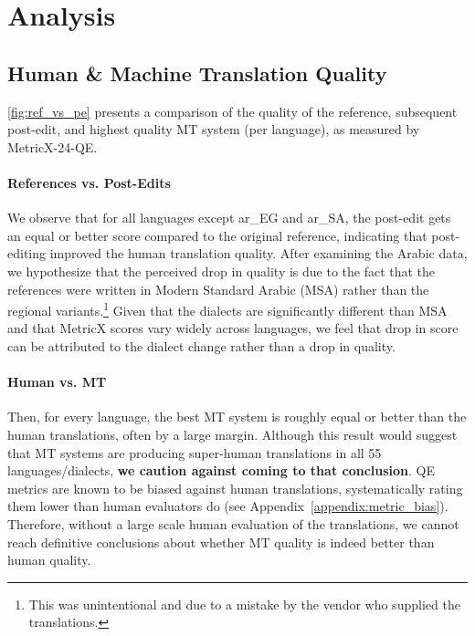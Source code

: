 \section{Analysis}



\subsection{Human \& Machine Translation Quality}
\label{sec:human_vs_mt_quality}

\autoref{fig:ref_vs_pe} presents a comparison of the quality of the reference, subsequent post-edit, and highest quality MT system (per language), as measured by MetricX-24-QE.


\paragraph{References vs. Post-Edits}
We observe that for all languages except ar\_EG and ar\_SA, the post-edit gets an equal or better score compared to the original reference, indicating that post-editing improved the human translation quality.
After examining the Arabic data, we hypothesize that the perceived drop in quality is due to the fact that the  references were written in Modern Standard Arabic (MSA) rather than the regional variants.\footnote{
    This was unintentional and due to a mistake by the vendor who supplied the translations. 
}
Given that the dialects are significantly different than MSA and that Metric\-X scores vary widely across languages, we feel that drop in score can be attributed to the dialect change rather than a drop in quality.

\paragraph{Human vs. MT}
Then, for every language, the best MT system is roughly equal or better than the human translations, often by a large margin.
Although this result would suggest that MT systems are producing super-human translations in all 55 languages/dialects, \textbf{we caution against coming to that conclusion}.
QE metrics are known to be biased against human translations, systematically rating them lower than human evaluators do (see Appendix~\ref{appendix:metric_bias}).
Therefore, without a large scale human evaluation of the translations, we cannot reach definitive conclusions about whether MT quality is indeed better than human quality.


